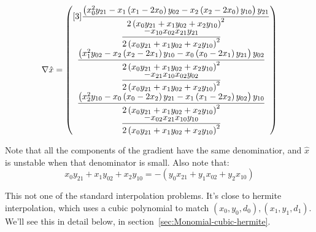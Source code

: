 \begin{equation}
\nabla \hat{x} =
\begin{pmatrix}[3]
\dfrac{
\left(
x_0^2 y_{21}
-
x_1 \left( x_1 - 2 x_0 \right) y_{02}
- 
x_2 \left( x_2 - 2 x_0 \right) y_{10}
\right)
y_{21}
}{ %
2 \left( x_0 y_{21} + x_1 y_{02} + x_2 y_{10} \right)^{2}
} 
\\ %
\dfrac{
- x_{10} x_{02} x_{21} y_{21}
}{
2 \left( x_0 y_{21} + x_1 y_{02} + x_2 y_{10} \right)^{2}
} 
\\  %
\dfrac{
\left(
x_1^2 y_{02}
-
x_2 \left( x_2 - 2 x_1 \right) y_{10}
- 
x_0 \left( x_0 - 2 x_1 \right) y_{21}
\right)
y_{02}
}{ %
2 \left( x_0 y_{21} + x_1 y_{02} + x_2 y_{10} \right)^{2}
}
\\ %
\dfrac{
- x_{21} x_{10} x_{02} y_{02}
}{ %
2 \left( x_0 y_{21} + x_1 y_{02} + x_2 y_{10} \right)^{2}
} 
\\ %
\dfrac{
\left(
x_2^2 y_{10}
-
x_0 \left( x_0 - 2 x_2 \right) y_{21}
- 
x_1 \left( x_1 - 2 x_2 \right) y_{02}
\right)
y_{10}
}{ %
2 \left( x_0 y_{21} + x_1 y_{02} + x_2 y_{10} \right)^{2}
}
\\ %
\dfrac{
- x_{02} x_{21} x_{10} y_{10}
}{ %
2 \left( x_0 y_{21} + x_1 y_{02} + x_2 y_{10} \right)^{2}
}
\end{pmatrix}
\end{equation}

Note that all the components of the gradient have the same 
denominatior, and
$\hat{x}$ is unstable when that denominator is small.
Also note that:
\begin{equation}
x_0 y_{21} + x_1 y_{02} + x_2 y_{10}
=
- \left(
y_0 x_{21} + y_1 x_{02} + y_2 x_{10}
\right)
\end{equation}

\label{sec:monomial-yyd}

This not one of the standard interpolation problems.
It's close to hermite interpolation,
which uses a cubic polynomial to match
$(x_0,y_0,d_0),(x_1,y_1,d_1)$.
We'll see this in detail below,
in section~\ref{sec:Monomial-cubic-hermite}.

